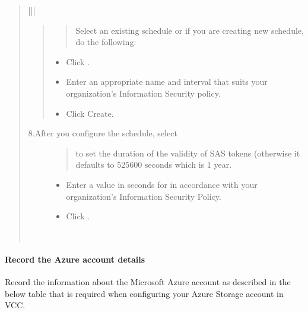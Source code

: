 \documentclass[letterpaper,10pt,english]{sphinxmanual}
\begin{document}
\begin{quote}
\begin{savenotes}
\begin{tabular}[t]{|*{2}{|}}
\begin{quote}
\begin{quote}
Select an existing schedule or if you are creating
new schedule, do the following:
\end{quote}
\begin{itemize}
\item {} 
Click .

\item {} 
Enter an appropriate name and interval that suits
your organization’s Information Security policy.

\item {} 
Click Create.

\end{itemize}
\end{quote}
\begin{description}
\item[{8.After you configure the schedule, select}] \leavevmode\begin{quote}

 to set the
duration of the validity of SAS tokens (otherwise it
defaults to 525600 seconds which is 1 year.
\end{quote}
\begin{itemize}
\item {} 
Enter a value in seconds for  in
accordance with your organization’s Information
Security Policy.

\item {} 
Click .

\end{itemize}

\end{description}
\\
\hline
\end{tabular}
\par
\sphinxattableend\end{savenotes}
\end{quote}


\paragraph{Record the Azure account details}
\label{\detokenize{mcdmp_app_ug:record-azure-account-details}}\label{\detokenize{mcdmp_app_ug:record-the-azure-account-details}}
Record the information about the Microsoft Azure account as described in the below table that is required when configuring your Azure Storage account in VCC.
\end{document}
